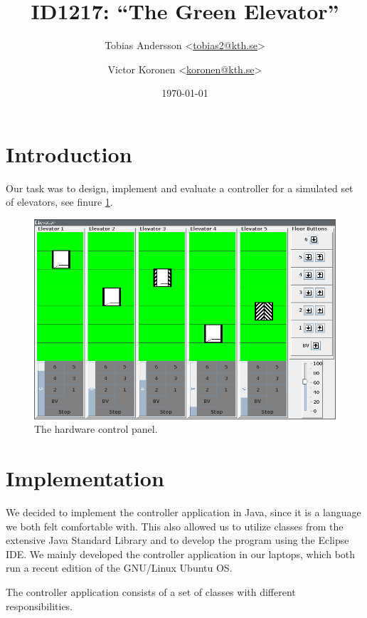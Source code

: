 \documentclass[a4paper]{article}
\title{ID1217: ``The Green Elevator''}
\author{%
    Tobias Andersson <\href{mailto:tobias2@kth.se}{tobias2@kth.se}> \and
    Victor Koronen <\href{mailto:koronen@kth.se}{koronen@kth.se}>
}
\date{\today}
\begin{document}
\maketitle
\thispagestyle{empty}

\section{Introduction}

Our task was to design, implement and evaluate a controller for a simulated set
of elevators, see finure \ref{fig:hardware_control_panel}.

\begin{figure}[p]
    \centering
    \includegraphics[width=1.0\textwidth]{images/elevators_5_6.png}
    \caption{The hardware control panel.}
    \label{fig:hardware_control_panel}
\end{figure}

\section{Implementation}

We decided to implement the controller application in Java, since it is a
language we both felt comfortable with. This also allowed us to utilize classes
from the extensive Java Standard Library and to develop the program using the
Eclipse IDE. We mainly developed the controller application in our laptops,
which both run a recent edition of the GNU/Linux Ubuntu OS.

The controller application consists of a set of classes with different
responsibilities.
\end{document}
